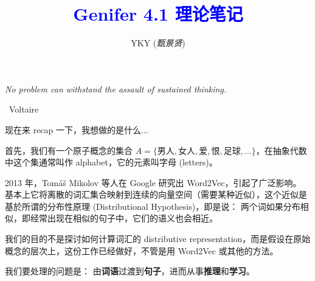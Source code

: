 \documentclass[12pt]{article}
\title{\textcolor{blue}{Genifer 4.1 理论笔记}}
\author{YKY (\textit{甄景贤})}
\newcommand{\tab}{\hspace*{1cm}}
\begin{document}
\tab\tab\tab \parbox{9cm}{\textit{No problem can withstand the assault of sustained thinking.}}
\begin{flushright}
\textemdash\, Voltaire \hspace*{2cm}
\end{flushright}

\sffamily

{\let\newpage\relax\maketitle}

\maketitle
\setlength{\parindent}{0em}
\setlength{\parskip}{1.5ex plus0.5ex minus1.2ex}

现在来 recap 一下，我想做的是什么...

首先，我们有一个原子概念的集合 $A = \{ \mbox{男人}, \mbox{女人}, \mbox{爱}, \mbox{恨}, \mbox{足球},... \}$，在抽象代数中这个集通常叫作 alphabet，它的元素叫字母 (letters)。 

2013 年，Tom\'{a}\v{s} Mikolov 等人在 Google 研究出 Word2Vec，引起了广泛影响。  基本上它将离散的词汇集合映射到连续的向量空间（需要某种近似），这个近似是基於所谓的分布性原理 (Distributional Hypothesis)，即是说： 两个词如果分布相似，即经常出现在相似的句子中，它们的语义也会相近。 

我们的目的不是探讨如何计算词汇的 distributive representation，而是假设在原始概念的层次上，这份工作已经做好，不管是用 Word2Vec 或其他的方法。  


我们要处理的问题是： 由\textbf{词语}过渡到\textbf{句子}，进而从事\textbf{推理}和\textbf{学习}。
\end{document}
